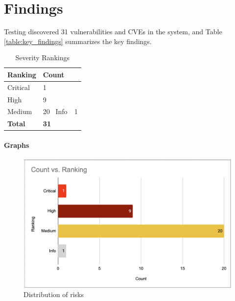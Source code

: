 \chapter{Findings}
Testing discovered 31 vulnerabilities and CVEs in the system, and Table \ref{table:key_findings} summarizes the key findings.

\begingroup
\centering
\setlength{\tabcolsep}{6.5pt} %
\renewcommand{\arraystretch}{1.8} %
\begin{longtable}{ |p{5cm}| p{10cm} |}
\caption{Severity Rankings}
    \label{table:rankings}
\hline
{}
\textbf{Ranking}  & \textbf{Count}\\
\hline
Critical  & 1\\
\hline
High  & 9\\
\hline
Medium  & 20\
\hline
Info  & 1\\
\hline
\hline
\textbf{Total}  & \textbf{31}\\
\hline
\end{longtable}
\endgroup
\newpage

\subsubsection{Graphs}
\begin{figure}[h!]
\centering
\includegraphics[width=\textwidth]{pics/rankings.png}
\caption{Distribution of risks}\label{fig:bar_risks}
\end{figure}

